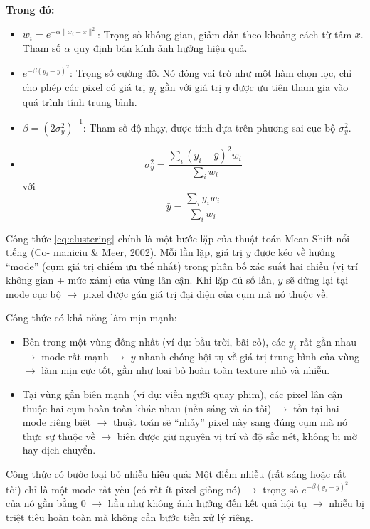 \documentclass[a4paper]{report}
\begin{document}
\textbf{Trong đó:}

\begin{itemize}
    \item $w_i = e^{-\alpha\|x_i-x\|^2}$: Trọng số không gian, giảm dần theo khoảng cách từ tâm $x$.
          Tham số $\alpha$ quy định bán kính ảnh hưởng hiệu quả.
    \item $e^{-\beta(y_i-y)^2}$: Trọng số cường độ. Nó đóng vai trò như một hàm chọn lọc, chỉ cho
          phép các pixel có giá trị $y_i$ gần với giá trị $y$ được ưu tiên tham gia vào quá
          trình tính trung bình.
    \item $\beta = (2\sigma_y^2)^{-1}$: Tham số độ nhạy, được tính dựa trên phương sai cục bộ $\sigma_y^2$.
    \item
          \[
              \sigma_y^2 = \frac{\sum_i (y_i-\bar{y})^2 w_i}{\sum_i w_i}
          \]
          với
          \[
              \bar{y} = \frac{\sum_i y_i w_i}{\sum_i w_i}
          \]
\end{itemize}

Công thức \ref{eq:clustering} chính là một bước lặp của thuật toán Mean-Shift nổi tiếng (Co-
maniciu \& Meer, 2002\cite{comaniciu2002}). Mỗi lần lặp, giá trị $y$ được kéo về hướng ``mode'' (cụm
giá trị chiếm ưu thế nhất) trong phân bố xác suất hai chiều (vị trí không gian +
mức xám) của vùng lân cận. Khi lặp đủ số lần, $y$ sẽ dừng lại tại mode cục bộ $\rightarrow$
pixel được gán giá trị đại diện của cụm mà nó thuộc về.

Công thức có khả năng làm mịn mạnh:

\begin{itemize}
    \item Bên trong một vùng đồng nhất (ví dụ: bầu trời, bãi cỏ), các $y_i$ rất gần nhau
          $\rightarrow$ mode rất mạnh $\rightarrow$ $y$ nhanh chóng hội tụ về giá trị trung bình của vùng $\rightarrow$
          làm mịn cực tốt, gần như loại bỏ hoàn toàn texture nhỏ và nhiễu.
    \item Tại vùng gần biên mạnh (ví dụ: viền người quay phim), các pixel lân cận thuộc
          hai cụm hoàn toàn khác nhau (nền sáng và áo tối) $\rightarrow$ tồn tại hai mode riêng
          biệt $\rightarrow$ thuật toán sẽ ``nhảy'' pixel này sang đúng cụm mà nó thực sự thuộc về
          $\rightarrow$ biên được giữ nguyên vị trí và độ sắc nét, không bị mờ hay dịch chuyển.
\end{itemize}

Công thức có bước loại bỏ nhiễu hiệu quả: Một điểm nhiễu (rất sáng hoặc rất tối)
chỉ là một mode rất yếu (có rất ít pixel giống nó) $\rightarrow$ trọng số $e^{-\beta(y_i-y)^2}$ của nó gần
bằng 0 $\rightarrow$ hầu như không ảnh hưởng đến kết quả hội tụ $\rightarrow$ nhiễu bị triệt tiêu hoàn
toàn mà không cần bước tiền xử lý riêng.
\end{document}

